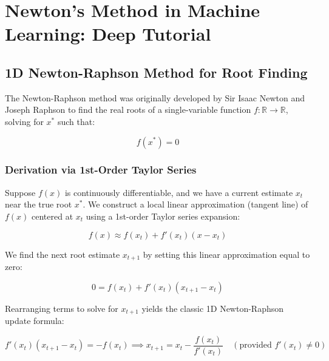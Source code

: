 \chapter{Newton's Method in Machine Learning: Deep Tutorial}
\label{ch:newton}

\section{1D Newton-Raphson Method for Root Finding}
The Newton-Raphson method was originally developed by Sir Isaac Newton and Joseph Raphson to find the real roots of a single-variable function $f: \mathbb{R} \to \mathbb{R}$, solving for $x^*$ such that:

\begin{equation}
f(x^*) = 0
\end{equation}

\subsection{Derivation via 1st-Order Taylor Series}
Suppose $f(x)$ is continuously differentiable, and we have a current estimate $x_t$ near the true root $x^*$. We construct a local linear approximation (tangent line) of $f(x)$ centered at $x_t$ using a 1st-order Taylor series expansion:

\begin{equation}
f(x) \approx f(x_t) + f'(x_t)(x - x_t)
\end{equation}

We find the next root estimate $x_{t+1}$ by setting this linear approximation equal to zero:

\begin{equation}
0 = f(x_t) + f'(x_t)(x_{t+1} - x_t)
\end{equation}

Rearranging terms to solve for $x_{t+1}$ yields the classic 1D Newton-Raphson update formula:

\begin{equation}
f'(x_t)(x_{t+1} - x_t) = -f(x_t) \implies x_{t+1} = x_t - \frac{f(x_t)}{f'(x_t)} \quad (\text{provided } f'(x_t) \neq 0)
\end{equation}

